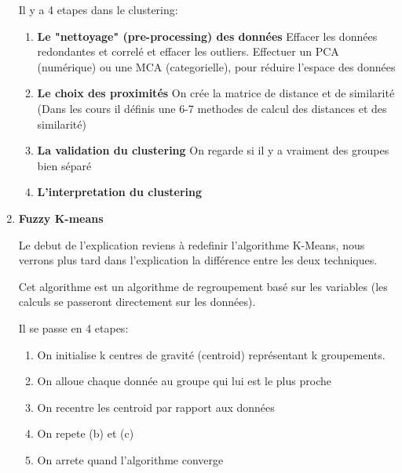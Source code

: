 \documentclass[a4paper, 11pt, onecolumn]{article}
\begin{document}
\begin{enumerate}
  \begin{description}
  \end{description}


Il y a 4 etapes dans le clustering:
\begin{enumerate}
\item \textbf{Le "nettoyage" (pre-processing) des données}
Effacer les données redondantes et correlé et effacer les outliers.
Effectuer un PCA (numérique) ou une MCA (categorielle), pour réduire l'espace des données
\item \textbf{Le choix des proximités}
On crée la matrice de distance et de similarité (Dans les cours il définis une 6-7 methodes de calcul des distances et des similarité)
\item \textbf{La validation du clustering} On regarde si il y a vraiment des groupes bien séparé
\item \textbf{L'interpretation du clustering}
\end{enumerate}


\item \textbf{Fuzzy K-means}

Le debut de l'explication reviens à redefinir l'algorithme K-Means, nous verrons plus tard dans l'explication la différence entre les deux techniques. 

Cet algorithme est un algorithme de regroupement basé sur les variables (les calculs se passeront directement sur les données).

Il se passe en 4 etapes:
\begin{enumerate}
\item On initialise k centres de gravité (centroid) représentant k groupements.
\item On alloue chaque donnée au groupe qui lui est le plus proche
\item On recentre les centroid par rapport aux données
\item On repete (b) et (c)
\item On arrete quand l'algorithme converge
\end{enumerate}


\end{enumerate}
\end{document}
